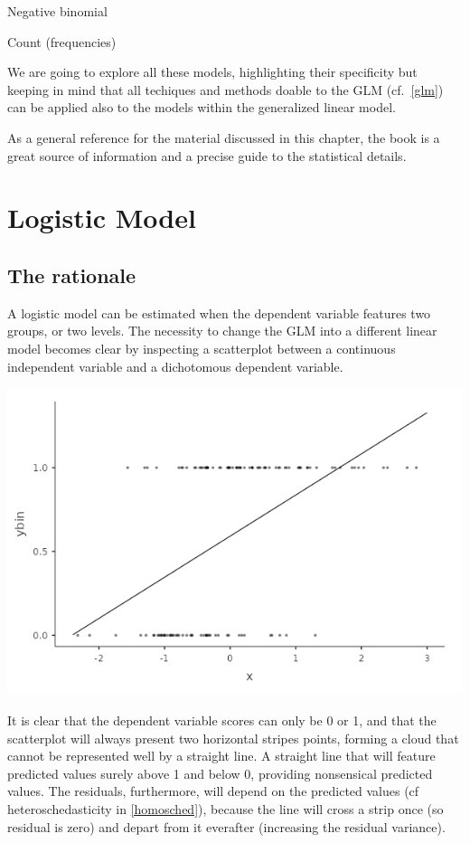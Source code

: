 \documentclass[
]{book}
\begin{document}
Negative binomial

Count (frequencies)

We are going to explore all these models, highlighting their specificity but keeping in mind that all techiques and methods doable to the GLM (cf.~\ref{glm}) can be applied also to the models within the generalized linear model.

As a general reference for the material discussed in this chapter, the book \citet{agresticategorical} is a great source of information and a precise guide to the statistical details.

\hypertarget{logistic}{%
\section{Logistic Model}\label{logistic}}

\hypertarget{the-rationale}{%
\subsection{The rationale}\label{the-rationale}}

A logistic model can be estimated when the dependent variable features two groups, or two levels. The necessity to change the GLM into a different linear model becomes clear by inspecting a scatterplot between a continuous independent variable and a dichotomous dependent variable.

\includegraphics{bookletpics/3_logistic_plot1.png}

It is clear that the dependent variable scores can only be 0 or 1, and that the scatterplot will always present two horizontal stripes points, forming a cloud that cannot be represented well by a straight line. A straight line that will feature predicted values surely above 1 and below 0, providing nonsensical predicted values. The residuals, furthermore, will depend on the predicted values (cf heteroschedasticity in \ref{homosched}), because the line will cross a strip once (so residual is zero) and depart from it everafter (increasing the residual variance).
\end{document}

